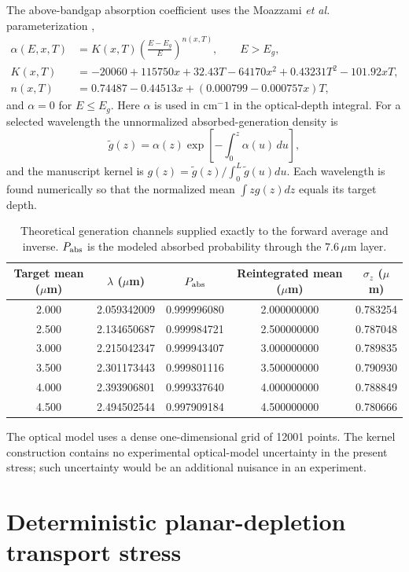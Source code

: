 \documentclass[aps,pra,onecolumn,superscriptaddress,nofootinbib]{revtex4-2}
\begin{document}
The above-bandgap absorption coefficient uses the Moazzami \emph{et al.} parameterization \cite{moazzami2005absorption},
\begin{align}
\alpha(E,x,T) &= K(x,T)\left(\frac{E-E_g}{E}\right)^{n(x,T)},\qquad E>E_g,\\
K(x,T) &= -20060+115750x+32.43T-64170x^2+0.43231T^2-101.92xT,\\
n(x,T) &= 0.74487-0.44513x+(0.000799-0.000757x)T,
\end{align}
and $\alpha=0$ for $E\le E_g$.  Here $\alpha$ is used in $\mathrm{cm^-1}$ in the optical-depth integral.  For a selected wavelength the unnormalized absorbed-generation density is
\begin{equation}
\tilde g(z)=\alpha(z)\exp\left[-\int_0^z\alpha(u)\,du\right],
\end{equation}
and the manuscript kernel is $g(z)=\tilde g(z)/\int_0^L\tilde g(u)du$.  Each wavelength is found numerically so that the normalized mean $\int zg(z)dz$ equals its target depth.

\begin{table}[h]
\caption{Theoretical generation channels supplied exactly to the forward average and inverse.  $P_{\rm abs}$ is the modeled absorbed probability through the $7.6\,\mu\mathrm{m}$ layer.}
\centering
\begin{tabular}{ccccc}
\toprule
Target mean ($\mu$m) & $\lambda$ ($\mu$m) & $P_{\rm abs}$ & Reintegrated mean ($\mu$m) & $\sigma_z$ ($\mu$m)\\
\midrule
2.000 & 2.059342009 & 0.999996080 & 2.000000000 & 0.783254\\
2.500 & 2.134650687 & 0.999984721 & 2.500000000 & 0.787048\\
3.000 & 2.215042347 & 0.999943407 & 3.000000000 & 0.789835\\
3.500 & 2.301173443 & 0.999801116 & 3.500000000 & 0.790930\\
4.000 & 2.393906801 & 0.999337640 & 4.000000000 & 0.788849\\
4.500 & 2.494502544 & 0.997909184 & 4.500000000 & 0.780666\\
\bottomrule
\end{tabular}
\end{table}

The optical model uses a dense one-dimensional grid of 12001 points.  The kernel construction contains no experimental optical-model uncertainty in the present stress; such uncertainty would be an additional nuisance in an experiment.

\section{Deterministic planar-depletion transport stress}
\end{document}
